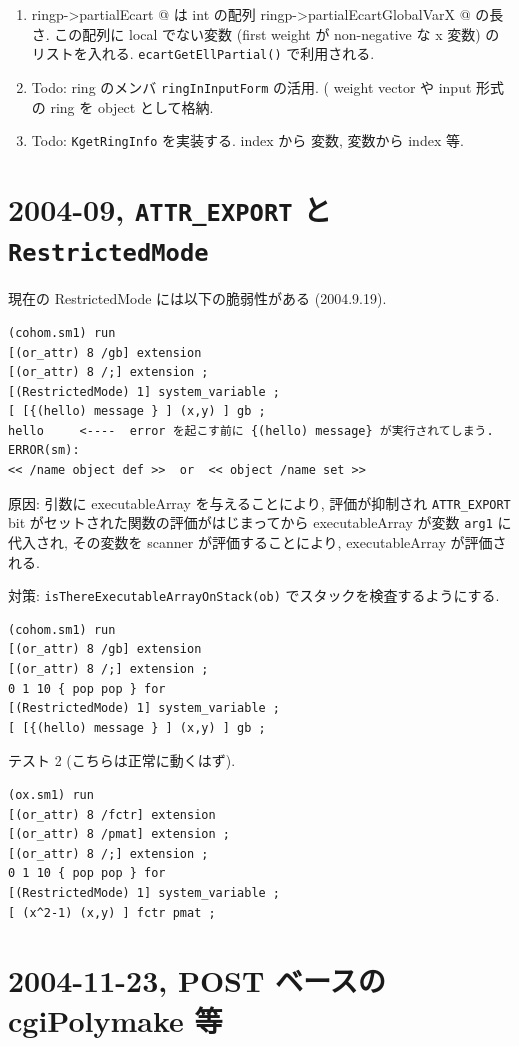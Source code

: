 \documentclass{jarticle}
\begin{document}
\begin{enumerate}
\item \verb@ ringp->partialEcart @ は int の配列
\verb@ ringp->partialEcartGlobalVarX @ の長さ.
この配列に local でない変数 (first weight が non-negative な x 変数) のリストを入れる.
{\tt ecartGetEllPartial()} で利用される.
\item Todo: ring のメンバ {\tt ringInInputForm} の活用. ( weight vector や
input 形式の ring を object として格納.
\item Todo: {\tt KgetRingInfo} を実装する. index から 変数, 変数から index 等.
\end{enumerate}

\section{2004-09, {\tt ATTR\_EXPORT} と {\tt RestrictedMode}}

\noindent
現在の RestrictedMode には以下の脆弱性がある (2004.9.19).
\begin{verbatim}
(cohom.sm1) run
[(or_attr) 8 /gb] extension 
[(or_attr) 8 /;] extension ;
[(RestrictedMode) 1] system_variable ;
[ [{(hello) message } ] (x,y) ] gb ;
hello     <----  error を起こす前に {(hello) message} が実行されてしまう.
ERROR(sm): 
<< /name object def >>  or  << object /name set >>
\end{verbatim}
\noindent 原因: 
引数に executableArray を与えることにより, 評価が抑制され
{\tt ATTR\_EXPORT} bit がセットされた関数の評価がはじまってから
executableArray が変数 {\tt arg1} に代入され, その変数を scanner
が評価することにより, executableArray が評価される.

\noindent 対策:
{\tt isThereExecutableArrayOnStack(ob)} でスタックを検査するようにする.
\begin{verbatim}
(cohom.sm1) run
[(or_attr) 8 /gb] extension 
[(or_attr) 8 /;] extension ;
0 1 10 { pop pop } for
[(RestrictedMode) 1] system_variable ;
[ [{(hello) message } ] (x,y) ] gb ;
\end{verbatim}

テスト 2 (こちらは正常に動くはず).
\begin{verbatim}
(ox.sm1) run
[(or_attr) 8 /fctr] extension 
[(or_attr) 8 /pmat] extension ;
[(or_attr) 8 /;] extension ;
0 1 10 { pop pop } for
[(RestrictedMode) 1] system_variable ;
[ (x^2-1) (x,y) ] fctr pmat ;
\end{verbatim}

\section{2004-11-23, POST ベースの cgiPolymake 等}
\end{document}
